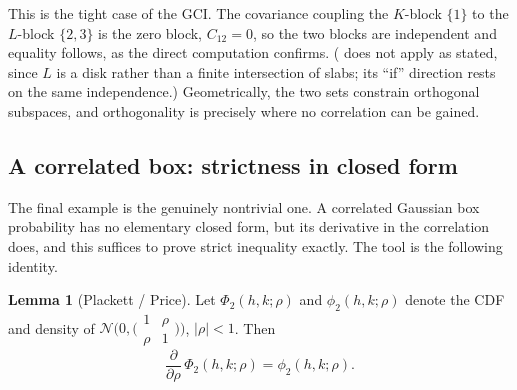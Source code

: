 \documentclass[12pt,a4paper]{article}
\theoremstyle{definition}
\newtheorem{lemma}[theorem]{Lemma}
\newcommand{\caln}{\mathcal{N}}
\begin{document}
This is the tight case of the GCI.  The covariance coupling the
$K$-block $\{1\}$ to the $L$-block $\{2,3\}$ is the zero block,
$C_{12}=0$, so the two blocks are independent and equality follows, as
the direct computation confirms.  ( does not apply
as stated, since $L$ is a disk rather than a finite intersection of
slabs; its ``if'' direction rests on the same independence.)  Geometrically, the two sets constrain orthogonal
subspaces, and orthogonality is precisely where no correlation can be
gained.

\subsection{A correlated box: strictness in closed form}\label{sub:ex-box}

The final example is the genuinely nontrivial one.  A correlated
Gaussian box probability has no elementary closed form, but its
derivative in the correlation does, and this suffices to prove strict
inequality exactly.  The tool is the following identity.

\begin{lemma}[Plackett / Price]\label{lem:ex-plackett}
  Let $\Phi_2(h,k;\rho)$ and $\phi_2(h,k;\rho)$ denote the CDF and
  density of $\caln\!\bigl(0,\bigl(\begin{smallmatrix}1&\rho\\\rho&1
  \end{smallmatrix}\bigr)\bigr)$, $|\rho|<1$.  Then
  \begin{equation}\label{eq:ex-plackett}
    \frac{\partial}{\partial\rho}\,\Phi_2(h,k;\rho)
    =\phi_2(h,k;\rho).
  \end{equation}
\end{lemma}
\end{document}

